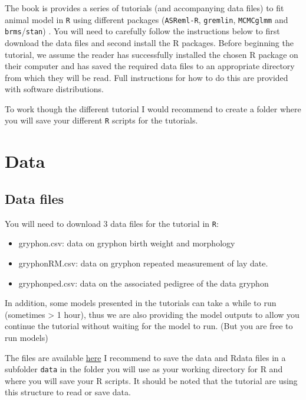 \documentclass[
  12pt,
]{book}
\providecommand{\tightlist}{%
  \setlength{\itemsep}{0pt}\setlength{\parskip}{0pt}}
\begin{document}
The book is provides a series of tutorials (and accompanying data files) to fit animal model in \texttt{R} using different packages (\texttt{ASReml-R}, \texttt{gremlin}, \texttt{MCMCglmm} and \texttt{brms}/\texttt{stan}) .
You will need to carefully follow the instructions below to first download the data files and second install the R packages.
Before beginning the tutorial, we assume the reader has successfully installed the chosen R package on their computer and has saved the required data files to an appropriate directory from which they will be read.
Full instructions for how to do this are provided with software distributions.

To work though the different tutorial I would recommend to create a folder where you will save your different \texttt{R} scripts for the tutorials.

\hypertarget{data}{%
\section{Data}\label{data}}

\hypertarget{data-files}{%
\subsection{Data files}\label{data-files}}

You will need to download 3 data files for the tutorial in \texttt{R}:

\begin{itemize}
\tightlist
\item
  gryphon.csv: data on gryphon birth weight and morphology
\item
  gryphonRM.csv: data on gryphon repeated measurement of lay date.
\item
  gryphonped.csv: data on the associated pedigree of the data gryphon
\end{itemize}

In addition, some models presented in the tutorials can take a while to run (sometimes \textgreater{} 1 hour), thus we are also providing the model outputs to allow you continue the tutorial without waiting for the model to run. (But you are free to run models)

The files are available \href{https://github.com/JulienGAMartin/wam_tuto/tree/master/data}{here}
I recommend to save the data and Rdata files in a subfolder \texttt{data} in the folder you will use as your working directory for R and where you will save your R scripts. It should be noted that the tutorial are using this structure to read or save data.
\end{document}
